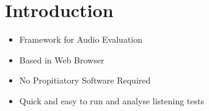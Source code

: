 \vspace{-0.8cm}
\section{Introduction}

\begin{itemize}%
	\item Framework for Audio Evaluation
	\item Based in Web Browser
	\item No Propitiatory Software Required
	\item Quick and easy to run and analyse listening tests
\end{itemize}